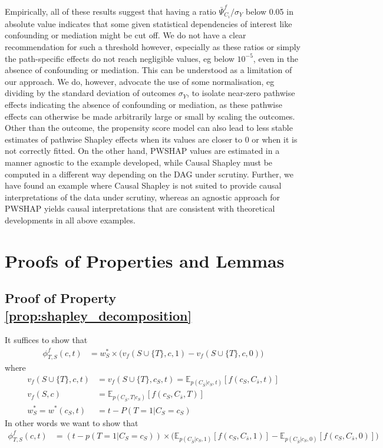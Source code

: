\documentclass{article}
\theoremstyle{plain}
\theoremstyle{definition}
\theoremstyle{remark}
\newcommand{\effect}{\Psi}
\theoremstyle{mystyle}
\newcommand{\coalitionshapley}[4]{\phi^{#1}_{#3,#2}(#4)}
\begin{document}
 Empirically, all of these results suggest that having a ratio $\bar{\effect}^f_{C_i} / \sigma_Y$ below 0.05 in absolute value indicates that some given statistical dependencies of interest like confounding or mediation might be cut off. We do not have a clear recommendation for such a threshold however, especially as these ratios or simply the path-specific effects do not reach negligible values, eg below $10^{-5}$, even in the absence of confounding or mediation. This can be understood as a limitation of our approach. We do, however, advocate the use of some normalisation, eg dividing by the standard deviation of outcomes $\sigma_Y$, to isolate near-zero pathwise effects indicating the absence of confounding or mediation, as these pathwise effects can otherwise be made arbitrarily large or small by scaling the outcomes. Other than the outcome, the propensity score model can also lead to less stable estimates of pathwise Shapley effects when its values are closer to 0 or when it is not correctly fitted. On the other hand, PWSHAP values are estimated in a manner agnostic to the example developed, while Causal Shapley must be computed in a different way depending on the DAG under scrutiny. Further, we have found an example where Causal Shapley is not suited to provide causal interpretations of the data under scrutiny, whereas an agnostic approach for PWSHAP yields causal interpretations that are consistent with theoretical developments in all above examples. 
\fi





\section{Proofs of Properties and Lemmas} \label{sec:proofs}


\subsection{Proof of Property \ref{prop:shapley_decomposition}}
\label{proof:shapley_decomposition}
It suffices to show that
\begin{align*}
    \coalitionshapley{f}{S}{T}{c,t} &= w^*_{S} \times \big(v_f(S \cup \{T\},c,1) - v_f(S \cup \{T\},c,0) \big)
\end{align*}
where 
\begin{align*}
     v_{f}(S \cup \{T\},c,t) &= v_{f}(S \cup \{T\},c_S,t) = \mathbb{E}_{p(C_{\bar{S}} | c_S, t)} [f(c_S, C_{\bar{s}}, t)] \\
     v_{f}(S, c) &= \mathbb{E}_{p(C_{\bar{S}}, T | c_S)} [f(c_S, C_{\bar{s}}, T)] \\
     w^*_{S} = w^*(c_S, t) &= t -  P(T=1| C_S=c_S)
\end{align*}
In other words we want to show that
\begin{align*}
    \coalitionshapley{f}{S}{T}{c,t} &= (t - p(T=1 | C_S=c_S)) \times \big(\mathbb{E}_{p(C_{\bar{S}} | c_S, 1)} [f(c_S, C_{\bar{s}}, 1)]  - \mathbb{E}_{p(C_{\bar{S}} | c_S, 0)} [f(c_S, C_{\bar{s}}, 0)]  \big)
\end{align*}
\end{document}
